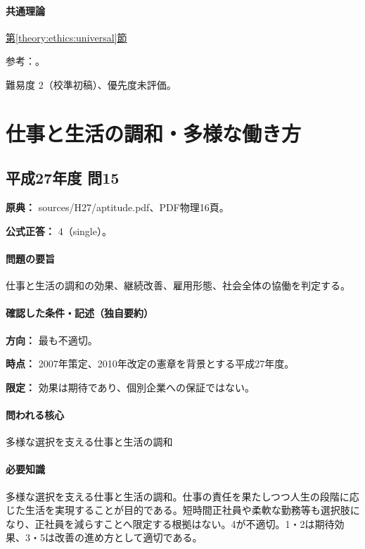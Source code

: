 \paragraph{共通理論} \hyperref[theory:ethics:universal]{第\ref*{theory:ethics:universal}節}

\par 参考：\cite{ncsu_ud1997}。

\par 難易度 2（校準初稿）、優先度未評価。

\section{仕事と生活の調和・多様な働き方}

\subsection{平成27年度 問15}
\label{q:h27-reg-apt-15}

\noindent\textbf{原典：} sources/H27/aptitude.pdf、PDF物理16頁。

\textbf{公式正答：} 4（single）。

\paragraph{問題の要旨} 仕事と生活の調和の効果、継続改善、雇用形態、社会全体の協働を判定する。

\paragraph{確認した条件・記述（独自要約）}\mbox{}\par

\noindent\textbf{方向：} 最も不適切。\par

\noindent\textbf{時点：} 2007年策定、2010年改定の憲章を背景とする平成27年度。\par

\noindent\textbf{限定：} 効果は期待であり、個別企業への保証ではない。\par

\paragraph{問われる核心} 多様な選択を支える仕事と生活の調和

\paragraph{必要知識} 多様な選択を支える仕事と生活の調和。仕事の責任を果たしつつ人生の段階に応じた生活を実現することが目的である。短時間正社員や柔軟な勤務等も選択肢になり、正社員を減らすことへ限定する根拠はない。4が不適切。1・2は期待効果、3・5は改善の進め方として適切である。

